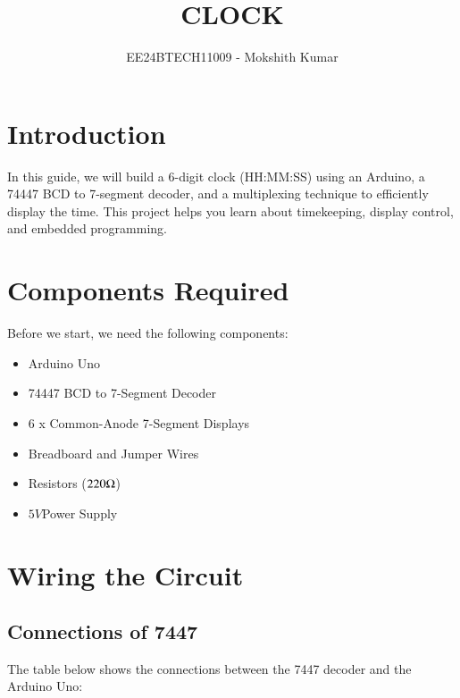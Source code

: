 \documentclass[journal]{IEEEtran}
\begin{document}

\vspace{3cm}

\title{CLOCK}
\author{EE24BTECH11009 - Mokshith Kumar}
{\let\newpage\relax\maketitle}

\renewcommand{\thefigure}{\theenumi}
\renewcommand{\thetable}{\theenumi}
\setlength{\intextsep}{10pt} %


\renewcommand{\thetable}{\theenumi}
\tableofcontents
\newpage

\section{Introduction}
In this guide, we will build a 6-digit clock (HH:MM:SS) using an Arduino, a 74447 BCD to 7-segment decoder, and a multiplexing technique to efficiently display the time. This project helps you learn about timekeeping, display control, and embedded programming.

\section{Components Required}
Before we start, we need the following components:
\begin{itemize}
\item Arduino Uno
\item 74447 BCD to 7-Segment Decoder
\item 6 x Common-Anode 7-Segment Displays
\item Breadboard and Jumper Wires
\item Resistors ($220 \ohm$)
\item $5V$Power Supply
\end{itemize}

\section{Wiring the Circuit}
 \subsection{Connections of 7447}
The table below shows the connections between the 7447 decoder and the Arduino Uno:
\end{document}
